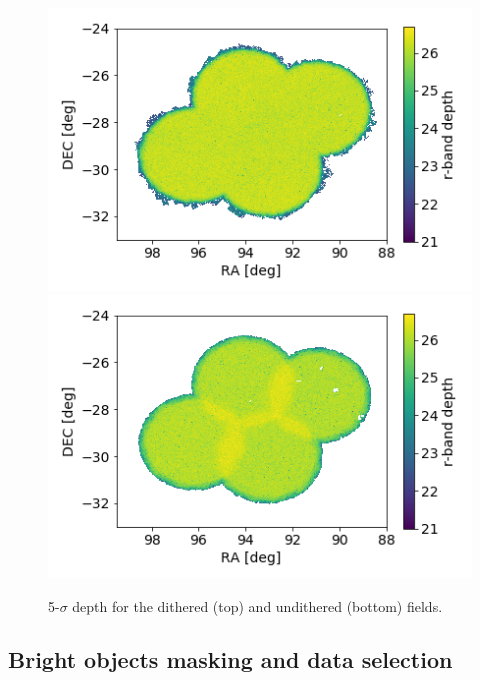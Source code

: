 \documentclass[\docopts]{\docclass}
\begin{document}
\begin{figure}
\centering
\includegraphics[width=0.9\columnwidth]{dithered_depth.png}
\includegraphics[width=0.9\columnwidth]{undithered_depth.png}
\caption{5-$\sigma$ depth for the dithered (top) and undithered (bottom) fields.}
\label{fig:depth_maps}
\end{figure}

\subsection{Bright objects masking and data selection}
\end{document}
